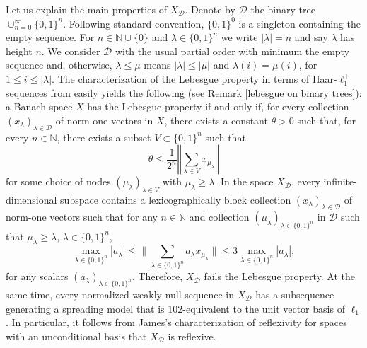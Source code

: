 \documentclass[12pt,a4paper]{amsart}
\newcommand{\N}{\mathbb{N}}
\newcommand{\bes}{\begin{equation*}}
\newcommand{\ees}{\end{equation*}}
\theoremstyle{definition}
\theoremstyle{plain}
\begin{document}
Let us explain the main properties of $X_\mathcal{D}$. Denote by $\mathcal{D}$ the binary tree $\cup_{n=0}^\infty\{0,1\}^n$.  Following standard convention, $\{0,1\}^0$ is a singleton containing the empty sequence. For $n\in\mathbb{N}\cup \{0\}$ and $\lambda\in\{0,1\}^n$ we write $|\lambda| = n$ and say $\lambda$ has height $n$. We consider $\mathcal{D}$ with the usual partial order with minimum the empty sequence and, otherwise, $\lambda \leq \mu$ means $|\lambda|\leq |\mu|$ and $\lambda(i) = \mu(i)$, for $1\leq i\leq |\lambda|$.  The characterization of the Lebesgue property in terms of Haar-$\ell_1^+$ sequences from \cite{gaebler:sari:2023} easily yields the following (see Remark \ref{lebesgue on binary trees}): a Banach space $X$ has the Lebesgue property if and only if, {for every collection $(x_\lambda)_{\lambda\in\mathcal{D}}$ of norm-one vectors in $X$, there exists a constant $\theta>0$ such that, for every $n\in\mathbb{N}$, there exists a subset $V\subset\{0,1\}^{n}$ such that
\bes\theta\leq \frac{1}{2^{n}}\left\Vert\sum_{\lambda\in V} x_{\mu_{\lambda}}\right\Vert \ees
for some choice of nodes $(\mu_{\lambda})_{\lambda\in V}$ with $\mu_{\lambda}\geq\lambda$.}
In the space $X_\mathcal{D}$, every infinite-dimensional subspace contains a lexicographically block collection $(x_\lambda)_{{\lambda\in\mathcal{D}}}$ of norm-one vectors such that for any $n\in\N$ and collection $(\mu_\lambda)_{\lambda\in\{0,1\}^n}$ in $\mathcal{D}$ such that $\mu_\lambda\geq\lambda$, $\lambda\in\{0,1\}^n$,
\begin{equation}
\label{intro ellinfty estimate}
\max_{\lambda\in\{0,1\}^n}|a_\lambda|\leq \Big\|\sum_{{\lambda\in\{0,1\}^{n}}} a_\lambda x_{\mu_\lambda}\Big\|  \leq 3  \max_{{\lambda\in\{0,1\}^n}}|a_\lambda|, 
\end{equation}
for any scalars $(a_\lambda)_{{\lambda\in\{0,1\}^n}}$. Therefore, $X_\mathcal{D}$ fails the Lebesgue property. At the same time, every normalized weakly null sequence in $X_\mathcal{D}$ has a subsequence generating a spreading model that is $102$-equivalent to the unit vector basis of $\ell_1$. In particular, it {follows from} James's characterization of reflexivity for spaces with an unconditional basis that $X_\mathcal{D}$ is reflexive.
\end{document}
